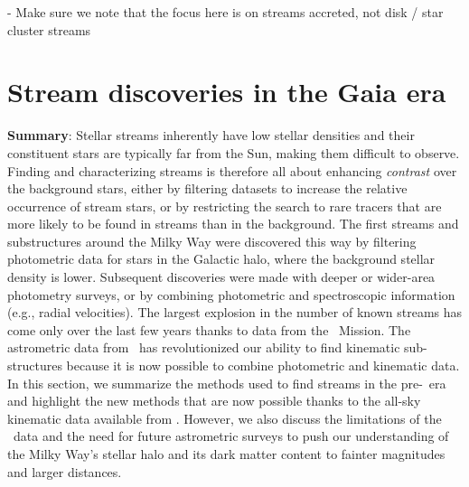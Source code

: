 \documentclass[final,5p,times,twocolumn,authoryear]{elsarticle}
\begin{document}
- Make sure we note that the focus here is on streams accreted, not disk / star cluster streams

\section{Stream discoveries in the Gaia era}
\label{sec:discovery}

\textbf{Summary}: Stellar streams inherently have low stellar densities and their
constituent stars are typically far from the Sun, making them difficult to observe.
Finding and characterizing streams is therefore all about enhancing \emph{contrast} over
the background stars, either by filtering datasets to increase the relative occurrence
of stream stars, or by restricting the search to rare tracers that are more likely to be
found in streams than in the background.
The first streams and substructures around the Milky Way were discovered this way by
filtering photometric data for stars in the Galactic halo, where the background stellar
density is lower.
Subsequent discoveries were made with deeper or wider-area photometry surveys, or by
combining photometric and spectroscopic information (e.g., radial velocities).
The largest explosion in the number of known streams has come only over the last few
years thanks to data from the \gaia\ Mission.
The astrometric data from \gaia\ has revolutionized our ability to find kinematic
sub-structures because it is now possible to combine photometric and kinematic data.
In this section, we summarize the methods used to find streams in the pre-\gaia\ era and
highlight the new methods that are now possible thanks to the all-sky kinematic data
available from \gaia.
However, we also discuss the limitations of the \gaia\ data and the need for future
astrometric surveys to push our understanding of the Milky Way's stellar halo and its
dark matter content to fainter magnitudes and larger distances.



\end{document}
